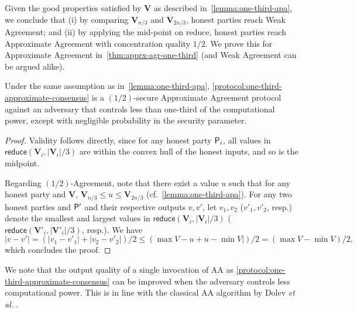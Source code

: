 Given the good properties satisfied by $\mathbf{V}$ as described in~\cref{lemma:one-third-apa}, we conclude that (i) by comparing $\mathbf{V}_{n / 3}$ and $\mathbf{V}_{2n / 3}$, honest parties reach Weak Agreement; and (ii) by applying the mid-point on \textsf{reduce}, honest parties reach Approximate Agreement with concentration quality $1/2$.
%
We prove this for Approximate Agreement in~\cref{thm:apprx-agr-one-third} (and Weak Agreement can be argued alike).

\begin{theorem} \label{thm:apprx-agr-one-third}
    Under the same assumption as in~\cref{lemma:one-third-apa}, \cref{protocol:one-third-approximate-consensus} is a $(1/2)$-secure Approximate Agreement protocol against an adversary that controls less than one-third of the computational power, except with negligible probability in the security parameter.
\end{theorem}

\begin{proof}
    Validity follows directly, since for any honest party $\mathsf{P}_i$, all values in $\mathsf{reduce}(\mathbf{V}_i, |\mathbf{V}_i| / 3)$ are within the convex hull of the honest inputs, and so is the midpoint.

    Regarding $(1/2)$-Agreement, note that there exist a value $u$ such that for any honest party \party and $\mathbf{V}$,  $\mathbf{V}_{n / 3} \le u \le \mathbf{V}_{2n / 3}$ (cf.~\cref{lemma:one-third-apa}).
    For any two honest parties \party and $\mathsf{P}'$ and their respective outputs $v, v'$, let $v_1, v_2$ ($v'_1, v'_2$, resp.) denote the smallest and largest values in $\mathsf{reduce}(\mathbf{V}_i, |\mathbf{V}_i| / 3)$ ($\mathsf{reduce}(\mathbf{V}'_i, |\mathbf{V}'_i| / 3)$, resp.).
    We have
    \[ |v - v'| = (|v_1 - v'_1|  + |v_2 - v'_2|)/ 2 \le (\max V - u + u - \min V|) / 2 = (\max V - \min V) / 2, \]
    which concludes the proof.
\end{proof}

\begin{remark}
    We note that the output quality of a single invocation of AA as \cref{protocol:one-third-approximate-consensus} can be improved when the adversary controls less computational power.
    This is in line with the classical AA algorithm by Dolev \textit{et al.} \cite{JACM:DLPSW86}.
\end{remark}

